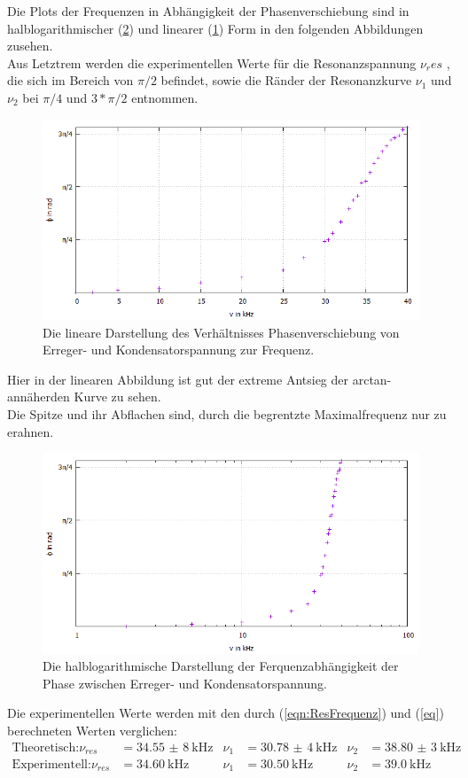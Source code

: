     Die Plots der Frequenzen in Abhängigkeit der Phasenverschiebung sind in halblogarithmischer (\ref{fig:Halb2}) und linearer (\ref{fig:Linear2}) Form in den folgenden Abbildungen zusehen.\\
    Aus Letztrem werden die experimentellen Werte für die Resonanzspannung $\nu_res$ , die sich im Bereich von $\pi/2$ befindet, sowie die Ränder der Resonanzkurve $\nu_1$ und $\nu_2$ bei $\pi/4$ und $3*\pi/2$ entnommen.
    \begin{figure}
      \centering
      \includegraphics[width=\textwidth]{Linear2.jpeg}
      \caption{Die lineare Darstellung des Verhältnisses Phasenverschiebung von Erreger- und Kondensatorspannung zur Frequenz.}
      \label{fig:Linear2}
    \end{figure}
    Hier in der linearen Abbildung ist gut der extreme Antsieg der arctan-annäherden Kurve zu sehen.\\Die Spitze und ihr Abflachen sind, durch die begrentzte Maximalfrequenz nur zu erahnen.
    \begin{figure}
      \centering
      \includegraphics[width=\textwidth]{Halblog2.jpeg}
      \caption{Die halblogarithmische Darstellung der Ferquenzabhängigkeit der Phase zwischen Erreger- und Kondensatorspannung.}
      \label{fig:Halb2}
    \end{figure}
    \newpage
    Die experimentellen Werte werden mit den durch (\ref{eqn:ResFrequenz}) und (\ref{eq}) berechneten Werten verglichen:
    \begin{align*}
      \text{Theoretisch:}\nu_{res} &= \SI{34,55(8)}{\kilo\hertz} & \nu_1 &= \SI{30,78(4)}{\kilo\hertz} & \nu_2 &= \SI{38,80(3)}{\kilo\hertz}\\
      \text{Experimentell:}\nu_{res} &= \SI{34,60}{\kilo\hertz} & \nu_1 &= \SI{30,50}{\kilo\hertz} & \nu_2 &= \SI{39,0}{\kilo\hertz}
    \end{align*}

